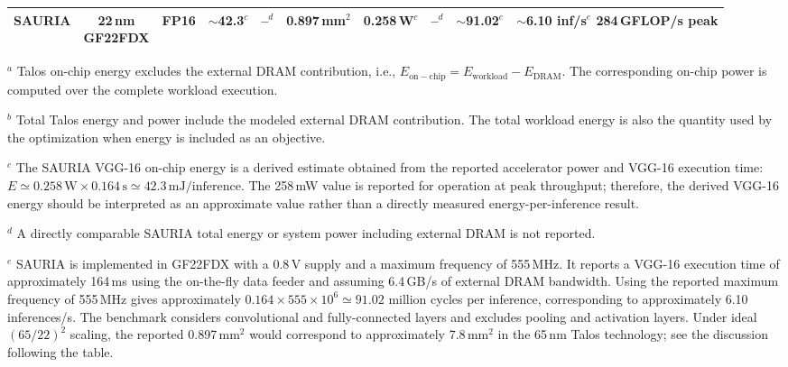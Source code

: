 \begin{table}[t]
{\begin{tabular}{@{}lccccccccc@{}}
SAURIA \cite{sauria2023} &
\makecell{22\,nm\\GF22FDX} &
FP16 &
$\sim$42.3$^{c}$ &
--$^{d}$ &
0.897\,mm$^2$ &
0.258\,W$^{c}$ &
--$^{d}$ &
$\sim$91.02$^{e}$ &
\makecell{$\sim$6.10 inf/s$^{e}$\\284\,GFLOP/s peak} \\

\hline
\end{tabular}%
}

\vspace{1mm}
\begin{minipage}{0.97\textwidth}
\footnotesize

$^{a}$ Talos on-chip energy excludes the external DRAM contribution,
i.e.,
$E_{\mathrm{on-chip}} =
E_{\mathrm{workload}} - E_{\mathrm{DRAM}}$.
The corresponding on-chip power is computed over the complete
workload execution.

$^{b}$ Total Talos energy and power include the modeled external DRAM
contribution. The total workload energy is also the quantity used by
the optimization when energy is included as an objective.

$^{c}$ The SAURIA VGG-16 on-chip energy is a derived estimate obtained
from the reported accelerator power and VGG-16 execution time:
$E \simeq 0.258\,\mathrm{W}\times0.164\,\mathrm{s}
\simeq42.3\,\mathrm{mJ/inference}$.
The 258\,mW value is reported for operation at peak throughput;
therefore, the derived VGG-16 energy should be interpreted as an
approximate value rather than a directly measured
energy-per-inference result.

$^{d}$ A directly comparable SAURIA total energy or system power
including external DRAM is not reported.

$^{e}$ SAURIA is implemented in GF22FDX with a 0.8\,V supply and a
maximum frequency of 555\,MHz. It reports a VGG-16 execution time of
approximately 164\,ms using the on-the-fly data feeder and assuming
6.4\,GB/s of
external DRAM bandwidth. Using the reported maximum frequency of
555\,MHz gives approximately
$0.164\times555\times10^6 \simeq 91.02$ million cycles per inference,
corresponding to approximately 6.10 inferences/s. The benchmark
considers convolutional and fully-connected layers and excludes
pooling and activation layers. Under ideal $(65/22)^2$ scaling, the
reported 0.897\,mm$^2$ would correspond to approximately 7.8\,mm$^2$
in the 65\,nm Talos technology; see the discussion following the
table.

\end{minipage}
\end{table}

